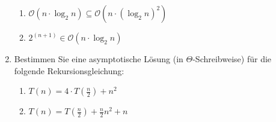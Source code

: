 \documentclass{lehramt-informatik-aufgabe}
\begin{document}
\begin{enumerate}
\begin{enumerate}

\item $\mathcal{O}(n \cdot \log_2 n) \subseteq \mathcal{O}(n \cdot (\log_2 n)^2)$


\item $2^{(n+1)} \in \mathcal{O}(n \cdot \log_2 n)$
\end{enumerate}


\item Bestimmen Sie eine asymptotische Lösung (in $\Theta$-Schreibweise) für
die folgende Rekursionsgleichung:

\begin{enumerate}


\item $T(n) = 4 \cdot T(\frac{n}{2}) + n^2$


\item $T(n) =  T(\frac{n}{2}) +\frac{n}{2} n^2 + n$
\end{enumerate}

\end{enumerate}
\end{document}
